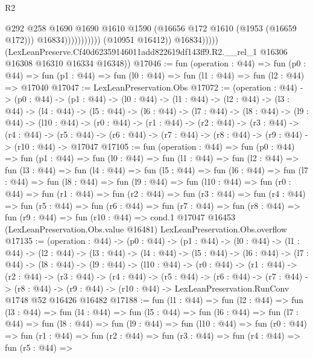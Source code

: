 \begin{lexlean}{R2}
\begin{coremodule}
                                        @292
                                        @258
                                        @1690
                                        @1690
                                        @1610
                                        @1590
                                        (@16656 @172 @1610 (@1953 (@16659 @172)))
                                        @16834)))))))))))
                  (@10951 @16412))
                @16834)))))
      (LexLeanPreserve.Cf40d62359146011add822619df143ff9.R2.__rel_1
        @16306
        @16308
        @16310
        @16334
        @16348))
@17046 := fun (operation : @44) =>
  fun (p0 : @44) => fun (p1 : @44) => fun (l0 : @44) => fun (l1 : @44) => fun (l2 : @44) => @17040
@17047 := LexLeanPreservation.Obs
@17072 := (operation : @44) ->
  (p0 : @44) ->
  (p1 : @44) ->
  (l0 : @44) ->
  (l1 : @44) ->
  (l2 : @44) ->
  (l3 : @44) ->
  (l4 : @44) ->
  (l5 : @44) ->
  (l6 : @44) ->
  (l7 : @44) ->
  (l8 : @44) ->
  (l9 : @44) ->
  (l10 : @44) ->
  (r0 : @44) ->
  (r1 : @44) ->
  (r2 : @44) ->
  (r3 : @44) ->
  (r4 : @44) ->
  (r5 : @44) -> (r6 : @44) -> (r7 : @44) -> (r8 : @44) -> (r9 : @44) -> (r10 : @44) -> @17047
@17105 := fun (operation : @44) =>
  fun (p0 : @44) =>
  fun (p1 : @44) =>
  fun (l0 : @44) =>
  fun (l1 : @44) =>
  fun (l2 : @44) =>
  fun (l3 : @44) =>
  fun (l4 : @44) =>
  fun (l5 : @44) =>
  fun (l6 : @44) =>
  fun (l7 : @44) =>
  fun (l8 : @44) =>
  fun (l9 : @44) =>
  fun (l10 : @44) =>
  fun (r0 : @44) =>
  fun (r1 : @44) =>
  fun (r2 : @44) =>
  fun (r3 : @44) =>
  fun (r4 : @44) =>
  fun (r5 : @44) =>
  fun (r6 : @44) =>
  fun (r7 : @44) =>
  fun (r8 : @44) =>
  fun (r9 : @44) =>
  fun (r10 : @44) =>
  cond.{1} @17047 @16453 (LexLeanPreservation.Obs.value @16481) LexLeanPreservation.Obs.overflow
@17135 := (operation : @44) ->
  (p0 : @44) ->
  (p1 : @44) ->
  (l0 : @44) ->
  (l1 : @44) ->
  (l2 : @44) ->
  (l3 : @44) ->
  (l4 : @44) ->
  (l5 : @44) ->
  (l6 : @44) ->
  (l7 : @44) ->
  (l8 : @44) ->
  (l9 : @44) ->
  (l10 : @44) ->
  (r0 : @44) ->
  (r1 : @44) ->
  (r2 : @44) ->
  (r3 : @44) ->
  (r4 : @44) ->
  (r5 : @44) ->
  (r6 : @44) ->
  (r7 : @44) ->
  (r8 : @44) -> (r9 : @44) -> (r10 : @44) -> LexLeanPreservation.RunConv @1748 @52 @16426 @16482
@17188 := fun (l1 : @44) =>
  fun (l2 : @44) =>
  fun (l3 : @44) =>
  fun (l4 : @44) =>
  fun (l5 : @44) =>
  fun (l6 : @44) =>
  fun (l7 : @44) =>
  fun (l8 : @44) =>
  fun (l9 : @44) =>
  fun (l10 : @44) =>
  fun (r0 : @44) =>
  fun (r1 : @44) =>
  fun (r2 : @44) =>
  fun (r3 : @44) =>
  fun (r4 : @44) =>
  fun (r5 : @44) =>

\end{coremodule}
\end{lexlean}
